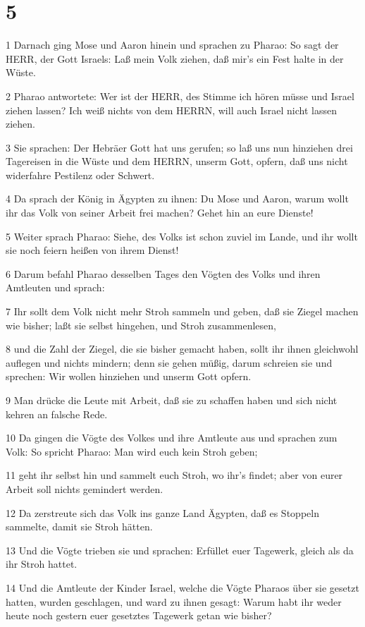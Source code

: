 \chapter{5}

\par 1 Darnach ging Mose und Aaron hinein und sprachen zu Pharao: So sagt der HERR, der Gott Israels: Laß mein Volk ziehen, daß mir's ein Fest halte in der Wüste.
\par 2 Pharao antwortete: Wer ist der HERR, des Stimme ich hören müsse und Israel ziehen lassen? Ich weiß nichts von dem HERRN, will auch Israel nicht lassen ziehen.
\par 3 Sie sprachen: Der Hebräer Gott hat uns gerufen; so laß uns nun hinziehen drei Tagereisen in die Wüste und dem HERRN, unserm Gott, opfern, daß uns nicht widerfahre Pestilenz oder Schwert.
\par 4 Da sprach der König in Ägypten zu ihnen: Du Mose und Aaron, warum wollt ihr das Volk von seiner Arbeit frei machen? Gehet hin an eure Dienste!
\par 5 Weiter sprach Pharao: Siehe, des Volks ist schon zuviel im Lande, und ihr wollt sie noch feiern heißen von ihrem Dienst!
\par 6 Darum befahl Pharao desselben Tages den Vögten des Volks und ihren Amtleuten und sprach:
\par 7 Ihr sollt dem Volk nicht mehr Stroh sammeln und geben, daß sie Ziegel machen wie bisher; laßt sie selbst hingehen, und Stroh zusammenlesen,
\par 8 und die Zahl der Ziegel, die sie bisher gemacht haben, sollt ihr ihnen gleichwohl auflegen und nichts mindern; denn sie gehen müßig, darum schreien sie und sprechen: Wir wollen hinziehen und unserm Gott opfern.
\par 9 Man drücke die Leute mit Arbeit, daß sie zu schaffen haben und sich nicht kehren an falsche Rede.
\par 10 Da gingen die Vögte des Volkes und ihre Amtleute aus und sprachen zum Volk: So spricht Pharao: Man wird euch kein Stroh geben;
\par 11 geht ihr selbst hin und sammelt euch Stroh, wo ihr's findet; aber von eurer Arbeit soll nichts gemindert werden.
\par 12 Da zerstreute sich das Volk ins ganze Land Ägypten, daß es Stoppeln sammelte, damit sie Stroh hätten.
\par 13 Und die Vögte trieben sie und sprachen: Erfüllet euer Tagewerk, gleich als da ihr Stroh hattet.
\par 14 Und die Amtleute der Kinder Israel, welche die Vögte Pharaos über sie gesetzt hatten, wurden geschlagen, und ward zu ihnen gesagt: Warum habt ihr weder heute noch gestern euer gesetztes Tagewerk getan wie bisher?
